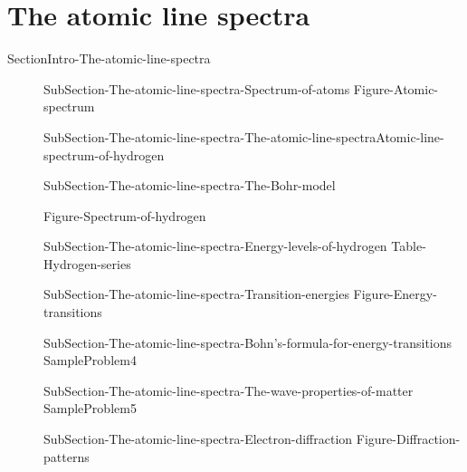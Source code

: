 \documentclass[main.tex]{subfiles}
\begin{document}
\section{The atomic line spectra}
{SectionIntro-The-atomic-line-spectra}
\sloppy
\begin{description}
\item[]{SubSection-The-atomic-line-spectra-Spectrum-of-atoms}
{Figure-Atomic-spectrum}
\item[]{SubSection-The-atomic-line-spectra-The-atomic-line-spectraAtomic-line-spectrum-of-hydrogen}
\item[]{SubSection-The-atomic-line-spectra-The-Bohr-model}

  {Figure-Spectrum-of-hydrogen}
\item[]{SubSection-The-atomic-line-spectra-Energy-levels-of-hydrogen}
\vspace{-0.5cm}{Figure-Energy-levels-of-hydrogen}
{Table-Hydrogen-series}

\item[]{SubSection-The-atomic-line-spectra-Transition-energies}
{Figure-Energy-transitions}
 \item[]{SubSection-The-atomic-line-spectra-Bohn's-formula-for-energy-transitions}
  {SampleProblem4}
\newpage\vspace{5cm}{Figure-Debroglie}
 \item[]{SubSection-The-atomic-line-spectra-The-wave-properties-of-matter}
  {SampleProblem5}
 \item[]{SubSection-The-atomic-line-spectra-Electron-diffraction}
 {Figure-Diffraction-patterns}
\end{description}
\newpage
\end{document}
